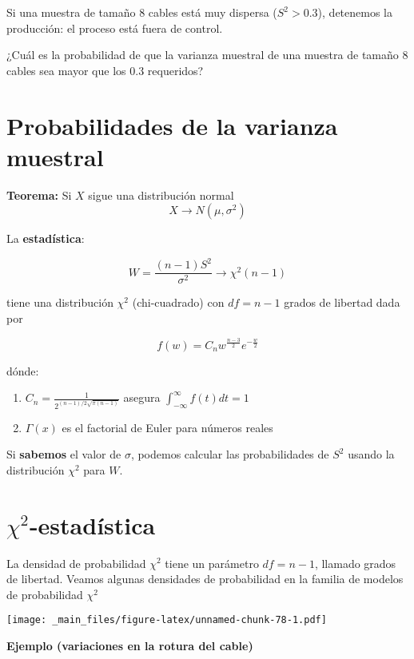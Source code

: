\documentclass[
]{book}
\providecommand{\tightlist}{%
  \setlength{\itemsep}{0pt}\setlength{\parskip}{0pt}}
\begin{document}
Si una muestra de tamaño \(8\) cables está muy dispersa (\(S^2>0.3\)), detenemos la producción: el proceso está fuera de control.

¿Cuál es la probabilidad de que la varianza muestral de una muestra de tamaño \(8\) cables sea mayor que los \(0.3\) requeridos?

\hypertarget{probabilidades-de-la-varianza-muestral}{%
\section{Probabilidades de la varianza muestral}\label{probabilidades-de-la-varianza-muestral}}

\textbf{Teorema:} Si \(X\) sigue una distribución normal
\[X \rightarrow N(\mu, \sigma^2)\]

La \textbf{estadística}:

\[W=\frac{(n-1)S^2}{\sigma^2} \rightarrow \chi^2(n-1)\]

tiene una distribución \(\chi^2\) (chi-cuadrado) con \(df=n-1\) grados de libertad dada por

\[f(w)=C_n w^{\frac{n-3}{2}} e^{-\frac{w}{2}}\]

dónde:

\begin{enumerate}
\def\labelenumi{\arabic{enumi})}
\tightlist
\item
  \(C_n=\frac{1}{2^{(n-1)/2\sqrt{\pi(n-1)}}}\) asegura \(\int_{-\infty}^{\infty} f (t)dt=1\)
\item
  \(\Gamma(x)\) es el factorial de Euler para números reales
\end{enumerate}

Si \textbf{sabemos} el valor de \(\sigma\), podemos calcular las probabilidades de \(S^2\) usando la distribución \(\chi^2\) para \(W\).

\hypertarget{chi2-estaduxedstica}{%
\section{\texorpdfstring{\(\chi^2\)-estadística}{\textbackslash chi\^{}2-estadística}}\label{chi2-estaduxedstica}}

La densidad de probabilidad \(\chi^2\) tiene un parámetro \(df=n-1\), llamado grados de libertad. Veamos algunas densidades de probabilidad en la familia de modelos de probabilidad \(\chi^2\)

\texttt{[image: \_main\_files/figure-latex/unnamed-chunk-78-1.pdf]}

\textbf{Ejemplo (variaciones en la rotura del cable)}
\end{document}
